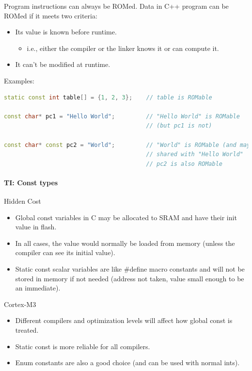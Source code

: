 Program instructions can always be ROMed.
Data in C++ program can be ROMed if it meets two criteria:
\begin{itemize}
  \item Its value is known before runtime.
  \begin{itemize}
    \item i.e., either the compiler or the linker knows it or can compute it.
  \end{itemize}
  \item It can't be modified at runtime.
\end{itemize}

Examples:
\begin{lstlisting}[language=C++]
static const int table[] = {1, 2, 3};    // table is ROMable

const char* pc1 = "Hello World";         // "Hello World" is ROMable
                                         // (but pc1 is not)

const char* const pc2 = "World";         // "World" is ROMable (and may be
                                         // shared with "Hello World"
                                         // pc2 is also ROMable
\end{lstlisting}

\paragraph{TI: Const types}
Hidden Cost
\begin{itemize}
  \item Global const variables in C may be allocated to SRAM and have their init value in flash.
  \item In all cases, the value would normally be loaded from memory (unless the compiler can see its initial value).
  \item Static const scalar variables are like \#define macro constants and will not be stored in memory if not needed (address not taken, value small enough to be an immediate).
\end{itemize}

Cortex-M3
\begin{itemize}
  \item Different compilers and optimization levels will affect how global const is treated.
  \item Static const is more reliable for all compilers.
  \item Enum constants are also a good choice (and can be used with normal ints).
\end{itemize}

